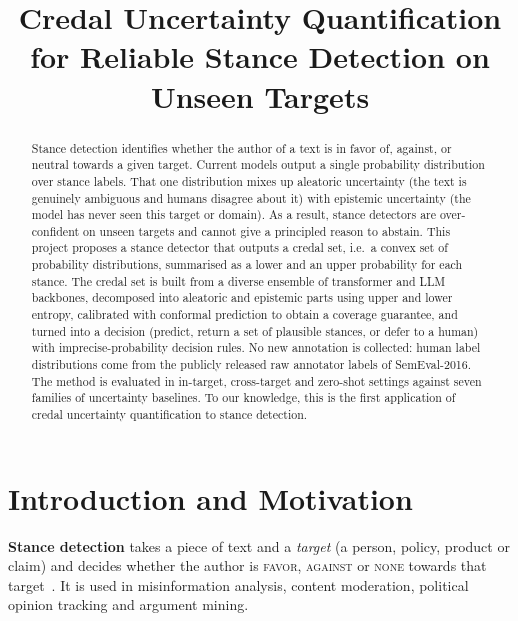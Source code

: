 \documentclass[11pt,a4paper]{article}
\title{Credal Uncertainty Quantification for Reliable Stance Detection on Unseen Targets}
\author{}
\date{}
\begin{document}
\maketitle
\vspace{-3em}

\begin{abstract}
\noindent
Stance detection identifies whether the author of a text is in favor of, against, or
neutral towards a given target. Current models output a single probability distribution
over stance labels. That one distribution mixes up aleatoric uncertainty (the text is
genuinely ambiguous and humans disagree about it) with epistemic uncertainty (the model has
never seen this target or domain). As a result, stance detectors are over-confident on
unseen targets and cannot give a principled reason to abstain. This project proposes a
stance detector that outputs a credal set, i.e.\ a convex set of probability
distributions, summarised as a lower and an upper probability for each stance. The credal
set is built from a diverse ensemble of transformer and LLM backbones, decomposed into
aleatoric and epistemic parts using upper and lower entropy, calibrated with conformal
prediction to obtain a coverage guarantee, and turned into a decision (predict, return a
set of plausible stances, or defer to a human) with imprecise-probability decision rules.
No new annotation is collected: human label distributions come from the publicly released
raw annotator labels of SemEval-2016. The method is evaluated in in-target, cross-target
and zero-shot settings against seven families of uncertainty baselines. To our knowledge,
this is the first application of credal uncertainty quantification to stance detection.
\end{abstract}

\tableofcontents
\newpage

\section{Introduction and Motivation}

\textbf{Stance detection} takes a piece of text and a \emph{target} (a person, policy,
product or claim) and decides whether the author is \textsc{favor}, \textsc{against} or
\textsc{none} towards that target~\cite{mohammad2016,kucuk2020,survey2024}. It is used in
misinformation analysis, content moderation, political opinion tracking and argument
mining.
\end{document}
